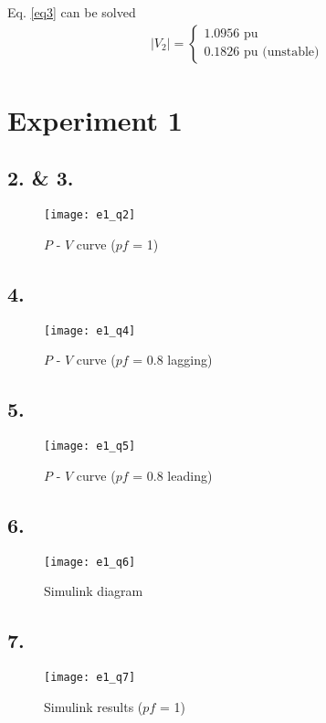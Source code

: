 \documentclass{article}
\begin{document}
Eq. \ref{eq3} can be solved
\begin{align*}
|V_2| =
\begin{cases}
1.0956 \text{ pu}\\
0.1826 \text{ pu (unstable)}
\end{cases}
\end{align*}


\section*{Experiment 1}

\subsection*{2. \& 3.}
\begin{figure}[H]
\centering
\texttt{[image: e1\_q2]}
\caption{$P$ - $V$ curve ($pf$ = 1)}
\end{figure}

\subsection*{4.}
\begin{figure}[H]
\centering
\texttt{[image: e1\_q4]}
\caption{$P$ - $V$ curve ($pf$ = 0.8 lagging)}
\end{figure}

\subsection*{5.}
\begin{figure}[H]
\centering
\texttt{[image: e1\_q5]}
\caption{$P$ - $V$ curve ($pf$ = 0.8 leading)}
\end{figure}

\subsection*{6.}
\begin{figure}[H]
\centering
\texttt{[image: e1\_q6]}
\caption{Simulink diagram}
\end{figure}

\subsection*{7.}
\begin{figure}[H]
\centering
\texttt{[image: e1\_q7]}
\caption{Simulink results ($pf$ = 1)}
\end{figure}
\end{document}
